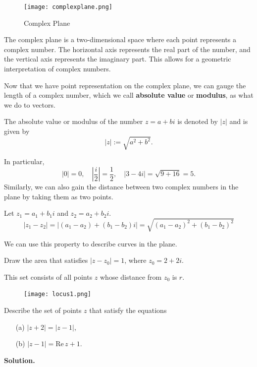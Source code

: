 \documentclass[
	12pt, %
	fleqn, %
	a4paper, %
]{LegrandOrangeBook}
\begin{document}
\begin{figure}[H]
    \centering
    \texttt{[image: complexplane.png]}
    \caption{Complex Plane}
\end{figure}

\begin{definition}
    The complex plane is a two-dimensional space where each point represents a complex number. The horizontal axis represents the real part of the number, and the vertical axis represents the imaginary part. This allows for a geometric interpretation of complex numbers.
\end{definition}
Now that we have point representation on the complex plane, we can gauge the length of a complex number, which we call
\textbf{absolute value} or \textbf{modulus}, as what we do to vectors.
\begin{definition}
    The absolute value or modulus of the number \( z = a + bi \) is denoted by \( |z| \) and is given by
\[ |z| := \sqrt{a^2 + b^2}. \]
\end{definition}
In particular,
\[ |0| = 0, \quad \left|\frac{i}{2}\right| = \frac{1}{2}, \quad |3 - 4i| = \sqrt{9 + 16} = 5. \]
Similarly, we can also gain the distance between two complex numbers in the plane by taking them as two points.
\begin{definition}
    Let \( z_1 = a_1 + b_1i \) and \( z_2 = a_2 + b_2i \). 
    \begin{equation}
        |z_1 - z_2| = |(a_1 - a_2) + (b_1 - b_2)i| = \sqrt{(a_1 - a_2)^2 + (b_1 - b_2)^2}
    \end{equation}
\end{definition}
We can use this property to describe curves in the plane.
\begin{example}
    Draw the area that satisfies $|z-z_0|=1$, where $z_0 = 2+2i$.
\end{example}

This set consists of all points $z$ whose distance from $z_0$ is $r$.
\begin{figure}[H]
    \centering
    \texttt{[image: locus1.png]}
\end{figure}
\begin{example}
    Describe the set of points \( z \) that satisfy the equations

\begin{enumerate}
\item[(a)] \( |z + 2| = |z - 1| \),
\item[(b)] \( |z - 1| = \text{Re} \, z + 1 \).
\end{enumerate}
\end{example}
\textbf{Solution.}
\end{document}
